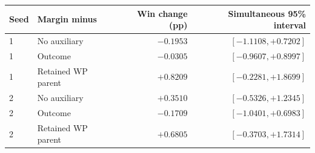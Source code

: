 \begin{tabular}{llrr}
\toprule
Seed & Margin minus & Win change (pp) & Simultaneous 95\% interval \\
\midrule
1 & No auxiliary & $-0.1953$ & $[-1.1108, +0.7202]$ \\
1 & Outcome & $-0.0305$ & $[-0.9607, +0.8997]$ \\
1 & Retained WP parent & $+0.8209$ & $[-0.2281, +1.8699]$ \\
2 & No auxiliary & $+0.3510$ & $[-0.5326, +1.2345]$ \\
2 & Outcome & $-0.1709$ & $[-1.0401, +0.6983]$ \\
2 & Retained WP parent & $+0.6805$ & $[-0.3703, +1.7314]$ \\
\bottomrule
\end{tabular}
